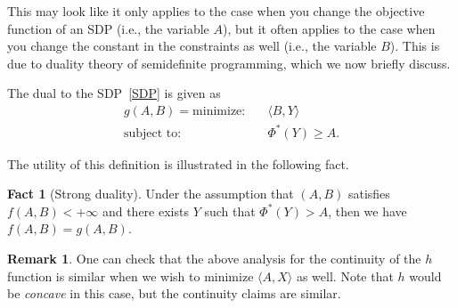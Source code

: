 \documentclass[11pt]{article}
\theoremstyle{definition}
\theoremstyle{definition}
\newtheorem{remark}[theorem]{Remark}
\newtheorem{fact}[theorem]{Fact}
\newcommand{\X}{\mathcal{X}}
\newcommand{\Herm}{\mathrm{Herm}}
\newcommand{\ip}[2]{\langle #1, #2 \rangle}
\begin{document}

This may look like it only applies to the case when you change the objective function of an SDP (i.e., the variable $A$), but it often applies to the case when you change the constant in the constraints as well (i.e., the variable $B$). 
This is due to duality theory of semidefinite programming, which we now briefly discuss.   

The dual to the SDP~\eqref{SDP} is given as 
\begin{align} 
g(A,B) = \text{minimize:} \quad & \ip{B}{Y} \\ 
\text{subject to:} \quad 
& \Phi^*(Y) \geq A. 
\end{align}  

The utility of this definition is illustrated in the following fact. 

\begin{fact}[Strong duality] \label{SD}
Under the assumption that $(A,B)$ satisfies $f(A,B) < + \infty$ and there exists $Y$ such that $\Phi^*(Y) > A$, then we have $f(A,B) = g(A,B)$.  
\end{fact} 

\begin{remark} 
One can check that the above analysis for the continuity of the $h$ function is similar when we wish to minimize $\ip{A}{X}$ as well. 
Note that $h$ would be \emph{concave} in this case, but the continuity claims are similar. 
\end{remark}
\end{document}
